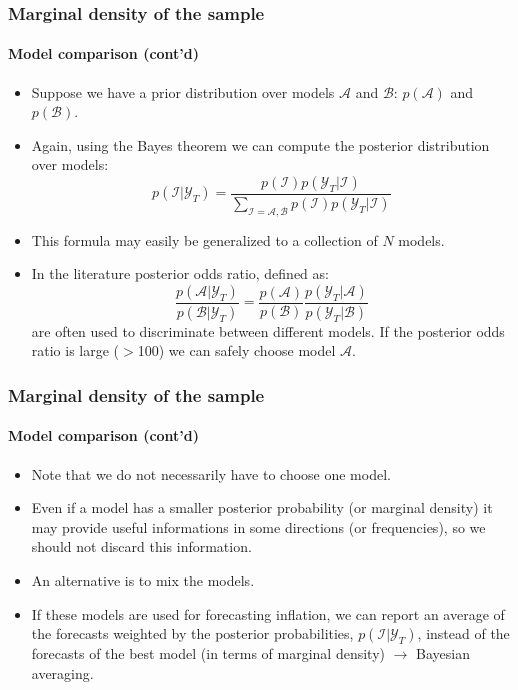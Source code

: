 \documentclass[10pt,slidestop]{beamer}
\newcommand{\sample}{\mathcal Y_T}
\begin{document}
\begin{frame}
  \frametitle{Marginal density of the sample}
  \framesubtitle{Model comparison (cont'd)}
  \begin{itemize}

        \item Suppose we have a prior distribution over models $\mathcal A$ and $\mathcal B$: 
          $p(\mathcal{A})$ and $p(\mathcal{B})$.
          \bigskip
        \item Again, using the Bayes theorem we can compute the posterior
            distribution over models:
            \[
            p(\mathcal{I}|\sample) = \frac{p(\mathcal{I})p(\sample|\mathcal{I})}
            {\sum_{\mathcal{I}=\mathcal{A},\mathcal{B}}p(\mathcal{I})p(\sample|\mathcal{I})}
            \]

        \item This formula may easily be generalized to a collection of $N$ models.
          \bigskip

        \item In the literature posterior odds ratio, defined as:
          \[
          \frac{p(\mathcal{A}|\sample)}{p(\mathcal{B}|\sample)} =
          \frac{p(\mathcal{A})}{p(\mathcal{B})}
          \frac{p(\sample|\mathcal{A})}{p(\sample|\mathcal{B})}
          \]
          are often used to discriminate between different models. If
          the posterior odds ratio is large ($>$100) we can safely
          choose model $\mathcal A$.

  \end{itemize}
\end{frame}


\begin{frame}
  \frametitle{Marginal density of the sample}
  \framesubtitle{Model comparison (cont'd)}
  \begin{itemize}
    \item Note that we do not necessarily have to choose one model.
      \bigskip
    \item Even if a model has a smaller posterior probability (or
      marginal density) it may provide useful informations in some
      directions (or frequencies), so we should not discard this
      information.
      \bigskip
    \item An alternative is to mix the models.
      \bigskip
    \item If these models are used for forecasting inflation, we can
      report an average of the forecasts weighted by the posterior
      probabilities, $p(\mathcal{I}|\sample)$, instead of the
      forecasts of the best model (in terms of marginal density)
      $\rightarrow$ Bayesian averaging.
  \end{itemize}
\end{frame}
\end{document}
